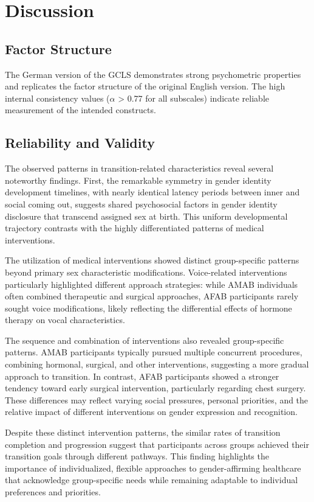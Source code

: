 \documentclass[12pt,a4paper]{article}
\begin{document}
\section{Discussion}

\subsection{Factor Structure}

The German version of the GCLS demonstrates strong psychometric properties and replicates the factor structure of the original English version. The high internal consistency values ($\alpha$ > 0.77 for all subscales) indicate reliable measurement of the intended constructs.

\subsection{Reliability and Validity}

The observed patterns in transition-related characteristics reveal several noteworthy findings. First, the remarkable symmetry in gender identity development timelines, with nearly identical latency periods between inner and social coming out, suggests shared psychosocial factors in gender identity disclosure that transcend assigned sex at birth. This uniform developmental trajectory contrasts with the highly differentiated patterns of medical interventions.

The utilization of medical interventions showed distinct group-specific patterns beyond primary sex characteristic modifications. Voice-related interventions particularly highlighted different approach strategies: while AMAB individuals often combined therapeutic and surgical approaches, AFAB participants rarely sought voice modifications, likely reflecting the differential effects of hormone therapy on vocal characteristics.

The sequence and combination of interventions also revealed group-specific patterns. AMAB participants typically pursued multiple concurrent procedures, combining hormonal, surgical, and other interventions, suggesting a more gradual approach to transition. In contrast, AFAB participants showed a stronger tendency toward early surgical intervention, particularly regarding chest surgery. These differences may reflect varying social pressures, personal priorities, and the relative impact of different interventions on gender expression and recognition.

Despite these distinct intervention patterns, the similar rates of transition completion and progression suggest that participants across groups achieved their transition goals through different pathways. This finding highlights the importance of individualized, flexible approaches to gender-affirming healthcare that acknowledge group-specific needs while remaining adaptable to individual preferences and priorities.
\end{document}
